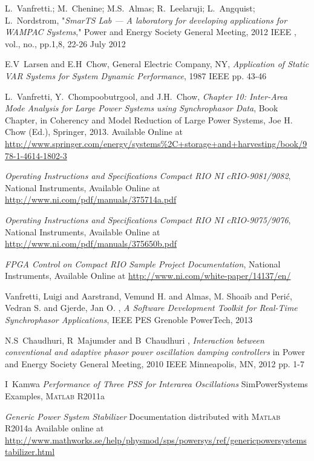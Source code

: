 \documentclass[journal]{IEEEtran}
\begin{document}
\begin{thebibliography}{1}
 L.~Vanfretti.; M.~Chenine; M.S.~Almas; R.~Leelaruji; L.~Angquist; L.~Nordstrom, "\emph{SmarTS Lab — A laboratory for developing applications for WAMPAC Systems}," Power and Energy Society General Meeting, 2012 IEEE , vol., no., pp.1,8, 22-26 July 2012

 E.V~Larsen and E.H~Chow, General Electric Company, NY, \emph{Application of Static VAR Systems for System Dynamic Performance}, 1987 IEEE pp. 43-46

  L.~Vanfretti, Y.~Chompoobutrgool, and J.H.~Chow, \emph{Chapter 10: Inter-Area Mode Analysis for Large Power Systems using Synchrophasor Data}, Book Chapter, in Coherency and Model Reduction of Large Power Systems, Joe H. Chow (Ed.), Springer, 2013. Available Online at \url{http://www.springer.com/energy/systems%2C+storage+and+harvesting/book/978-1-4614-1802-3}

 \emph{Operating Instructions and Specifications Compact RIO NI cRIO-9081/9082}, National Instruments, Available Online at \url{http://www.ni.com/pdf/manuals/375714a.pdf}
  
 \emph{Operating Instructions and Specifications Compact RIO NI cRIO-9075/9076}, National Instruments, Available Online at \url{http://www.ni.com/pdf/manuals/375650b.pdf}

 \emph{FPGA Control on Compact RIO Sample Project Documentation}, National Instruments, Available Online at \url{http://www.ni.com/white-paper/14137/en/}

 Vanfretti, Luigi and Aarstrand, Vemund H. and Almas, M. Shoaib and Peri\'c, Vedran S. and Gjerde, Jan O. , \emph{A Software Development Toolkit for Real-Time Synchrophasor Applications},  IEEE PES Grenoble PowerTech, 2013

 N.S~Chaudhuri, R~Majumder and B~Chaudhuri , \emph{Interaction between conventional and adaptive phasor power oscillation damping controllers} in Power and Energy Society General Meeting, 2010 IEEE Minneapolis, MN, 2012 pp. 1-7

 I~Kamwa \emph{Performance of Three PSS for Interarea Oscillations} SimPowerSystems Examples, \textsc{Matlab} R2011a

 \emph{Generic Power System Stabilizer} Documentation distributed with \textsc{Matlab} R2014a Available online at \url{http://www.mathworks.se/help/physmod/sps/powersys/ref/genericpowersystemstabilizer.html}

\end{thebibliography}
\end{document}
